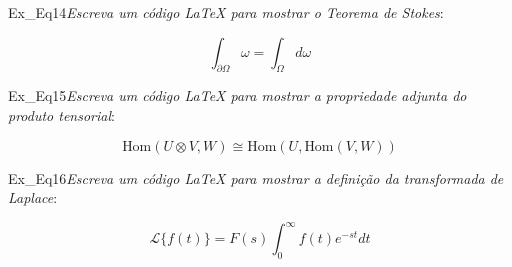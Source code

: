 \begin{texercise}{Ex_Eq14}\textit{Escreva um código LaTeX para mostrar o Teorema de Stokes}:\par\smallskip%
\begin{tcboutputlisting}
    \begin{center}
        \begin{equation*}
            \int_{\partial{\Omega}} \omega = \int_{\Omega} d\omega
        \end{equation*}
    \end{center}
\end{tcboutputlisting}
\tcbuselistingtext%
\end{texercise}

\begin{texercise}{Ex_Eq15}\textit{Escreva um código LaTeX para mostrar a propriedade adjunta do produto tensorial}:\par\smallskip%
\begin{tcboutputlisting}
    \begin{center}
        \begin{equation*}
            \text{Hom}(U \otimes V, W) \cong \text{Hom}(U, \text{Hom}(V,W))
        \end{equation*}
    \end{center}
\end{tcboutputlisting}
\tcbuselistingtext%
\end{texercise}
  
\begin{texercise}{Ex_Eq16}\textit{Escreva um código LaTeX para mostrar a definição da transformada de Laplace}:\par\smallskip%
\begin{tcboutputlisting}
    \begin{center}
        \begin{equation*}
            \mathcal{L} \lbrace f(t) \rbrace = F(s) \int_{0}^{\infty} f(t) e^{-st} dt
        \end{equation*}
    \end{center}
\end{tcboutputlisting}
\tcbuselistingtext%
\end{texercise}
  
